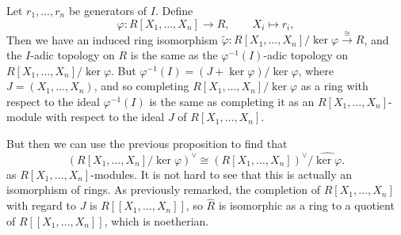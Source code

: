 Let $r_1, \ldots, r_n$ be generators of $I$. Define
\[ \varphi\colon R[X_1, \ldots, X_n] \to R,\qquad X_i\mapsto r_i, \]
Then we have an induced ring isomorphism
$\tilde{\varphi}\colon R[X_1, \ldots, X_n]/\ker\varphi \stackrel{\cong}{\longrightarrow} R$,
and the $I$-adic topology on $R$ is the same as the $\varphi^{-1}(I)$-adic
topology on $R[X_1, \ldots, X_n]/\ker\varphi$. But $\varphi^{-1}(I) = (J + \ker\varphi)/\ker\varphi$,
where $J = (X_1, \ldots, X_n)$, and so completing $R[X_1, \ldots, X_n]/\ker\varphi$
as a ring with respect to the ideal $\varphi^{-1}(I)$ is the same as completing
it as an $R[X_1, \ldots, X_n]$-module with respect to the ideal $J$ of
$R[X_1, \ldots, X_n]$.

But then we can use the previous proposition to find that
\[ (R[X_1, \ldots, X_n]/\ker\varphi)^{\vee} \cong (R[X_1, \ldots, X_n])^{\vee}/\hat{\ker\varphi}. \]
as $R[X_1, \ldots, X_n]$-modules. It is not hard to see that this is actually
an isomorphism of rings. As previously remarked, the completion of  $R[X_1, \ldots, X_n]$ with regard
to $J$ is $R[[X_1, \ldots, X_n]]$, so $\hat{R}$ is isomorphic as a ring to
a quotient of $R[[X_1, \ldots, X_n]]$, which is noetherian.

